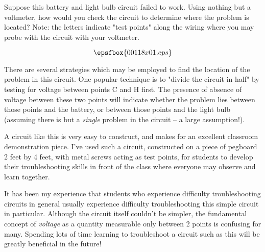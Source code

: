 

Suppose this battery and light bulb circuit failed to work.  Using nothing but a voltmeter, how would you check the circuit to determine where the problem is located?  Note: the letters indicate "test points" along the wiring where you may probe with the circuit with your voltmeter.

$$\epsfbox{00118x01.eps}$$







There are several strategies which may be employed to find the location of the problem in this circuit.  One popular technique is to "divide the circuit in half" by testing for voltage between points C and H first.  The presence of absence of voltage between these two points will indicate whether the problem lies between those points and the battery, or between those points and the light bulb (assuming there is but a {\it single} problem in the circuit -- a large assumption!).







A circuit like this is very easy to construct, and makes for an excellent classroom demonstration piece.  I've used such a circuit, constructed on a piece of pegboard 2 feet by 4 feet, with metal screws acting as test points, for students to develop their troubleshooting skills in front of the class where everyone may observe and learn together.

It has been my experience that students who experience difficulty troubleshooting circuits in general usually experience difficulty troubleshooting this simple circuit in particular.  Although the circuit itself couldn't be simpler, the fundamental concept of {\it voltage} as a quantity measurable only between 2 points is confusing for many.  Spending lots of time learning to troubleshoot a circuit such as this will be greatly beneficial in the future!




